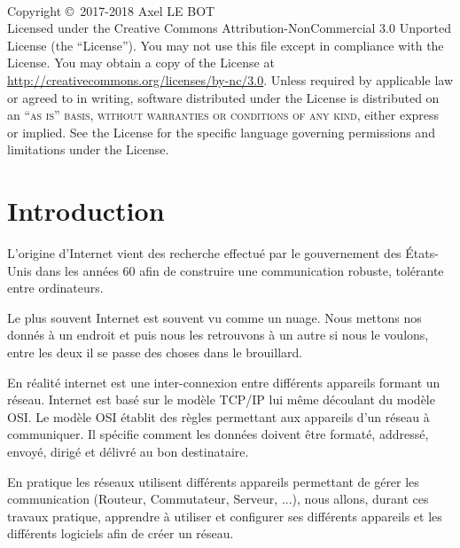 \documentclass[12pt,a4paper]{book} %
\begin{document}
\newpage
~\vfill
\thispagestyle{empty}

\noindent Copyright \copyright\ 2017-2018 Axel LE BOT \\ %

\noindent Licensed under the Creative Commons Attribution-NonCommercial 3.0 Unported License (the ``License''). You may not use this file except in compliance with the License. You may obtain a copy of the License at \url{http://creativecommons.org/licenses/by-nc/3.0}. Unless required by applicable law or agreed to in writing, software distributed under the License is distributed on an \textsc{``as is'' basis, without warranties or conditions of any kind}, either express or implied. See the License for the specific language governing permissions and limitations under the License.\\ %


\pagestyle{empty} %


\chapter*{Introduction}

L'origine d'Internet vient des recherche effectué par le gouvernement des États-Unis dans les années 60 afin de construire une communication robuste, tolérante entre ordinateurs.

Le plus souvent Internet est souvent vu comme un nuage. Nous mettons nos donnés à un endroit et puis nous les retrouvons à un autre si nous le voulons, entre les deux il se passe des choses dans le brouillard.

En réalité internet est une inter-connexion entre différents appareils formant un réseau.
Internet est basé sur le modèle TCP/IP lui même découlant du modèle OSI. Le modèle OSI établit des règles permettant aux appareils d'un réseau à communiquer. Il spécifie comment les données doivent être formaté, addressé, envoyé, dirigé et délivré au bon destinataire.

En pratique les réseaux utilisent différents appareils permettant de gérer les communication (Routeur, Commutateur, Serveur, ...), nous allons, durant ces travaux pratique, apprendre à utiliser et configurer ses différents appareils et les différents logiciels afin de créer un réseau.
\end{document}
